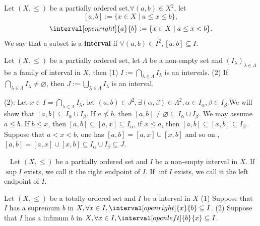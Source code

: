 \begin{definitionenv}[Intervals]
    Let $(X, \le)$ be a partially ordered set.$\forall (a, b)\in X^2$,  let 
    $$[a, b]:=\{x\in X\mid a\le x\le b \}, $$
     $$\interval[open right]{a}{b}:=\{x\in X\mid a\le x <b\}.$$ 
     We say that a subset is a \textbf{interval} if $\forall (a, b)\in I^2 , [a, b]\subseteq I$.
\end{definitionenv}
\begin{propositionenv}
    Let $(X, \le)$ be a partially ordered set,  let $\Lambda$ be a non-empty set and $(I_\lambda)_{\lambda\in \Lambda}$ be a family of interval in $X$,  then 
    \newline
    (1) $\displaystyle I:=\bigcap _{\lambda\in \Lambda}I_\lambda$ is an intervals.
    \newline
    (2) If $\displaystyle \bigcap _{\lambda\in \Lambda}I_\lambda\not=\varnothing $, then $\displaystyle J:=\bigcup_{\lambda\in \Lambda}I_\lambda$ is an interval.
\end{propositionenv}
\begin{proofenv}
    \quad 
    \newline
    (2): Let $x\in I=\bigcap _{\lambda\in \Lambda}I_\lambda$, let $(a, b)\in J^2, \exists (\alpha, \beta )\in \Lambda^2, \alpha\in I_\alpha, \beta\in I_\beta$.We will show that $[a, b]\subseteq I_\alpha\cup I_\beta$. If $a\not\le b $,  then $[a, b]\not =\varnothing\subseteq I_\alpha\cup I_\beta $. We may assume $a\le b $.
    \newline 
    If $b\le x$,  then $[a, b]\subseteq [a, x]\subseteq I_\alpha$,  if $x\le a $,  then $[a, b]\subseteq [x, b]\subseteq I_\beta$. Suppose that $a<x<b$,  one has $[a, b]=[a, x]\cup[x, b]$ and so on ,  $[a, b]=[a, x]\cup[x, b]\subseteq I_\alpha\cup I_\beta \subseteq J$.

\end{proofenv}
\begin{definitionenv}[Endpoints]
    \ \newline
    Let $(X, \le )$ be a partially ordered set and $I $ be a non-empty interval in $X$. 
    \newline
    If $\sup I$ exists,  we call it the right endpoint of $I$.
    \newline
    If $\inf I$ exists,  we call it the left endpoint of $I$.
\end{definitionenv}
\begin{propositionenv}
   Let $(X, \le )$ be a totally ordered set and $I $ be a interval in $X$ 
   \newline
   (1) Suppose that $I$ has a supremum $b$ in $X, \forall x\in I, \interval[open right]{x}{b}\subseteq I$.
   \newline
   (2) Suppose that $I$ has a infimum $b$ in $X, \forall x\in I, \interval[open left]{b}{x}\subseteq I$.
\end{propositionenv}
